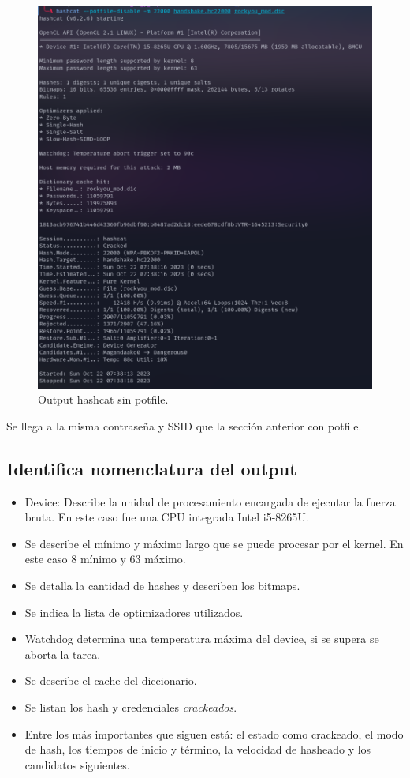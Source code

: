 \documentclass[letter,12pt]{article}
\begin{document}
\begin{figure}[H]
  \centering
  \includegraphics[width=16cm]{images/09-hashcat-potfile-disable.png}
  \caption{Output hashcat sin potfile.}
\end{figure}

Se llega a la misma contraseña y SSID que la sección anterior con potfile.

\subsection{Identifica nomenclatura del output}

\begin{itemize}
  \item Device: Describe la unidad de procesamiento encargada de ejecutar la fuerza bruta. En este caso fue una CPU integrada Intel i5-8265U.
  \item Se describe el mínimo y máximo largo que se puede procesar por el kernel. En este caso 8 mínimo y 63 máximo.
  \item Se detalla la cantidad de hashes y describen los bitmaps.
  \item Se indica la lista de optimizadores utilizados.
  \item Watchdog determina una temperatura máxima del device, si se supera se aborta la tarea.
  \item Se describe el cache del diccionario.
  \item Se listan los hash y credenciales \textit{crackeados}.
  \item Entre los más importantes que siguen está: el estado como crackeado, el modo de hash, los tiempos de inicio y término, la velocidad de hasheado y los candidatos siguientes.
\end{itemize}
\end{document}
